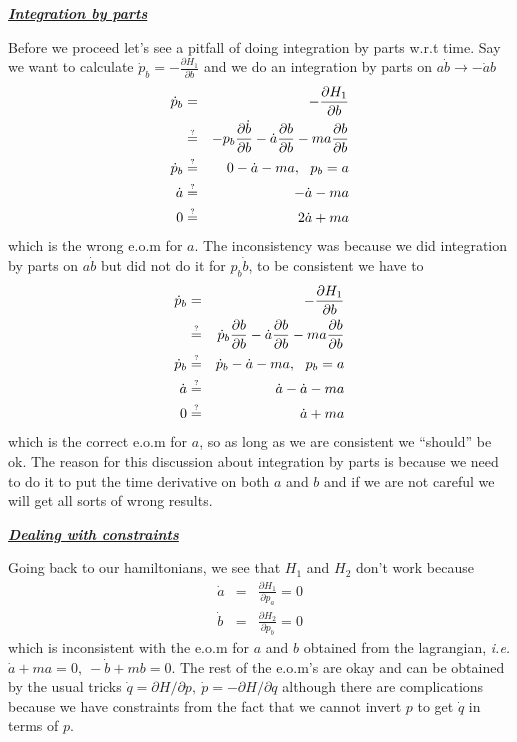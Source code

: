 \documentclass[aps,preprint,preprintnumbers,nofootinbib,showpacs,prd]{revtex4-1}
\newcommand{\ie}{{\it i.e.} }
\newcommand{\nbea}{\begin{eqnarray*}}
\newcommand{\neea}{\end{eqnarray*}}
\begin{document}
\bigskip
\underline{\textbf{\textit{Integration by parts}}}

Before we proceed let's see a pitfall of doing integration by parts w.r.t time. Say we want to calculate $\dot p_b = -\frac{\partial H_1}{\partial b}$ and we do an integration by parts on $a \dot b \to -\dot a b$
%
\nbea
\dot p_b & = & -\frac{\partial H_1}{\partial b} \\
& \stackrel{\text{\tiny ?}}{=} & -p_b \frac{\partial \dot b}{\partial b} - \dot a\frac{\partial b}{\partial b} - ma\frac{\partial b}{\partial b} \\
\dot p_b & \stackrel{\text{\tiny ?}}{=} & 0 - \dot a - ma, ~~p_b = a \\
\dot a & \stackrel{\text{\tiny ?}}{=} & -\dot a - ma \\
0 & \stackrel{\text{\tiny ?}}{=} & 2\dot a + ma
\neea
%
which is the wrong e.o.m for $a$. The inconsistency was because we did integration by parts on $a\dot b$ but did not do it for $p_b \dot b$, to be consistent we have to
%
\nbea
\dot p_b & = & -\frac{\partial H_1}{\partial b} \\
& \stackrel{\text{\tiny ?}}{=} & \dot p_b \frac{\partial b}{\partial b} - \dot a\frac{\partial b}{\partial b} - ma\frac{\partial b}{\partial b} \\
\dot p_b & \stackrel{\text{\tiny ?}}{=} & \dot p_b - \dot a - ma, ~~p_b = a \\
\dot a & \stackrel{\text{\tiny ?}}{=} & \dot a - \dot a - ma \\
0 & \stackrel{\text{\tiny ?}}{=} & \dot a + ma
\neea
%
which is the correct e.o.m for $a$, so as long as we are consistent we ``should'' be ok. The reason for this discussion about integration by parts is because we need to do it to put the time derivative on both $a$ and $b$ and if we are not careful we will get all sorts of wrong results.

\bigskip

\underline{\textbf{\textit{Dealing with constraints}}}

Going back to our hamiltonians, we see that $H_1$ and $H_2$ don't work because
%
\nbea
\dot a & = & \frac{\partial H_1}{\partial p_a} = 0 \\
\dot b & = & \frac{\partial H_2}{\partial p_b} = 0
\neea
%
which is inconsistent with the e.o.m for $a$ and $b$ obtained from the lagrangian, \ie $\dot a + ma = 0, ~ -\dot b + mb = 0$. The rest of the e.o.m's are okay and can be obtained by the usual tricks $\dot q = \partial H/\partial p,~\dot p = -\partial H/\partial q$ although there are complications because we have constraints from the fact that we cannot invert $p$ to get $\dot q$ in terms of $p$.
\end{document}
